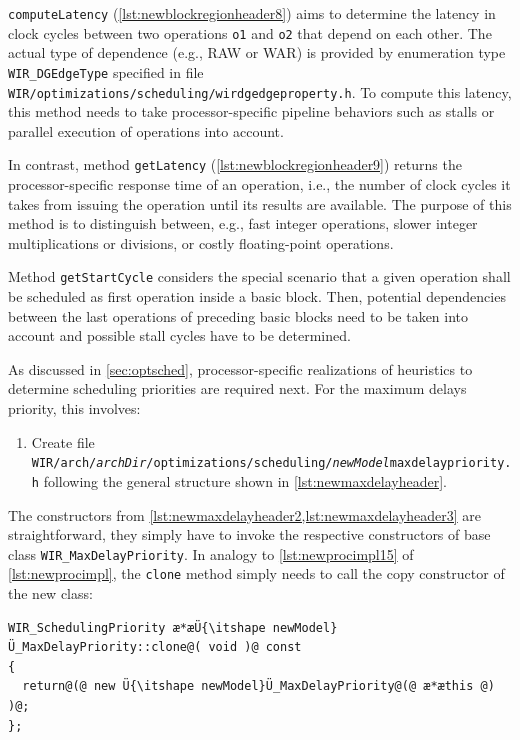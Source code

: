 \texttt{computeLatency} (\cref{lst:newblockregionheader8}) aims to determine the latency in clock cycles between two operations \texttt{o1} and \texttt{o2} that depend on each other.
The actual type of dependence (e.g., \gls{RAW} or \gls{WAR}) is provided by enumeration type \texttt{WIR\_DGEdgeType} specified in file \texttt{WIR/optimizations/scheduling/wirdgedgeproperty.h}.
To compute this latency, this method needs to take processor-specific pipeline behaviors such as stalls or parallel execution of operations into account.

In contrast, method \texttt{getLatency} (\cref{lst:newblockregionheader9}) returns the processor-specific response time of an operation, i.e., the number of clock cycles it takes from issuing the operation until its results are available.
The purpose of this method is to distinguish between, e.g., fast integer operations, slower integer multiplications or divisions, or costly floating-point operations.

Method \texttt{getStartCycle} considers the special scenario that a given operation shall be scheduled as first operation inside a basic block.
Then, potential dependencies between the last operations of preceding basic blocks need to be taken into account and possible stall cycles have to be determined.

As discussed in \cref{sec:optsched}, processor-specific realizations of heuristics to determine scheduling priorities are required next.
For the maximum delays priority, this involves:
\begin{enumerate}[resume]
    \item Create file \texttt{WIR/arch/{\itshape archDir}/optimizations/scheduling/{\itshape newModel}maxdelaypriority.h} following the general structure shown in \cref{lst:newmaxdelayheader}.\label{enum:maxdelay}
\end{enumerate}

The constructors from \cref{lst:newmaxdelayheader2,lst:newmaxdelayheader3} are straightforward, they simply have to invoke the respective constructors of base class \texttt{WIR\_MaxDelayPriority}.
In analogy to \cref{lst:newprocimpl15} of \cref{lst:newprocimpl}, the \texttt{clone} method simply needs to call the copy constructor of the new class: \\
\begin{lstlisting}[style=code,float=!h,belowskip=-0.8 \baselineskip]
WIR_SchedulingPriority æ*æÜ{\itshape newModel}Ü_MaxDelayPriority::clone@( void )@ const
{
  return@(@ new Ü{\itshape newModel}Ü_MaxDelayPriority@(@ æ*æthis @) )@;
};
\end{lstlisting}

